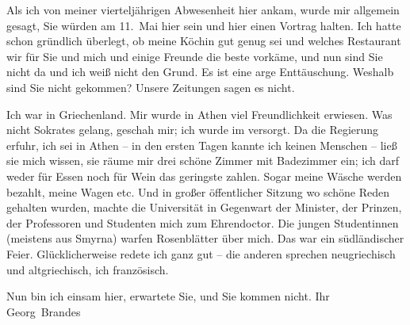 \pstart
           Als ich von meiner vierteljährigen Abwesenheit hier ankam, wurde mir allgemein
               gesagt, Sie würden am 11. Mai hier sein und hier einen Vortrag halten.
               Ich hatte schon gründlich überlegt, ob meine Köchin gut genug sei und welches Restaurant wir für Sie und
               mich und einige Freunde die beste vorkäme, und nun sind Sie nicht da und ich weiß
               nicht den Grund. Es ist eine arge Enttäuschung. Weshalb sind Sie nicht gekommen?
               Unsere Zeitungen sagen es nicht.\pend
           
\pstart
           Ich war in Griechenland. Mir wurde in Athen viel Freundlichkeit erwiesen. Was nicht Sokrates gelang, geschah mir; ich wurde im
                  \label{K_L02383-3v}\label{K_L02383-3} versorgt. Da die
               Regierung erfuhr, ich sei in Athen – in den
               ersten Tagen kannte ich keinen Menschen – ließ sie mich wissen, sie räume mir drei
               schöne Zimmer mit Badezimmer ein; ich darf weder für Essen noch für Wein das
               geringste zahlen. Sogar meine Wäsche werden bezahlt, meine Wagen etc. Und in großer
               öffentlicher Sitzung wo schöne Reden gehalten wurden, machte die Universität in Gegenwart der Minister, der Prinzen, der
               Professoren und Studenten mich zum Ehrendoctor. Die jungen Studentinnen (meistens aus
                  Smyrna) warfen Rosenblätter über mich. Das
               war ein südländischer Feier. Glücklicherweise redete ich ganz gut – die
               anderen sprechen neugriechisch und altgriechisch, ich französisch.\pend
           
\pstart
           Nun bin ich einsam hier, erwartete Sie, und Sie kommen nicht.\pend
           \pstart Ihr \spacefill\mbox{Georg Brandes}\pend{}\endnumbering{}  \newcommand{\dateiname}{L02383}\newcommand{\titel}{Georg Brandes an Arthur Schnitzler, 15. 5. 1922}\newcommand{\editorInnen}{Martin Anton Müller und Gerd-Hermann Susen}
